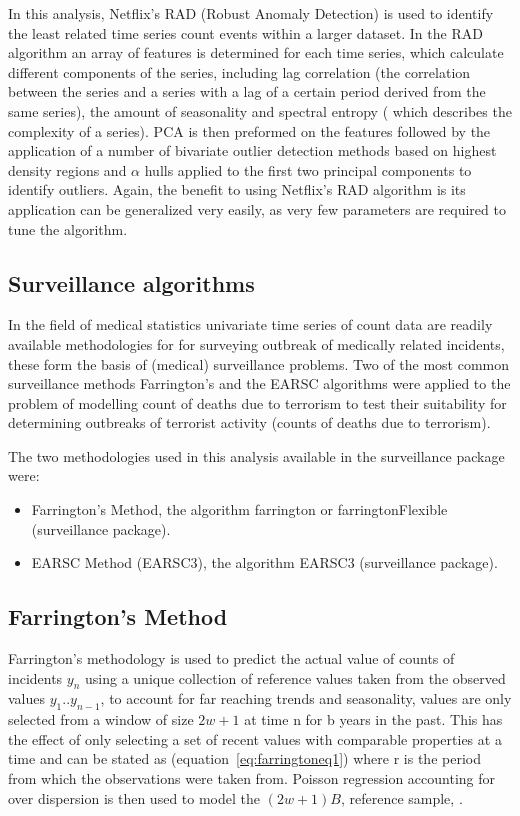 In this analysis, Netflix's RAD (Robust Anomaly Detection)  \citep{RAD2017} is used to identify the least related time series count events within a larger dataset. In the RAD algorithm an array of features is determined for each time series, which calculate different components of the series, including lag correlation (the correlation between the series and a series with a lag of a certain period derived from the same series), the amount of seasonality and spectral entropy ( which describes the complexity of a series). PCA is then preformed on the features followed by the application of a number of bivariate outlier detection methods based on highest density regions and $\alpha$ hulls applied to the first two principal components to identify outliers. Again, the benefit to using Netflix's RAD algorithm is its application can be generalized very easily, as very few parameters are required to tune the algorithm.
 
\subsection{Surveillance algorithms}

In the field of medical statistics univariate time series of count data are readily available methodologies for for surveying outbreak of medically related incidents, these form the basis of (medical) surveillance problems. Two of the most common surveillance methods Farrington's \citep{farrington1996statistical} and the EARSC algorithms \citep{fricker2008comparing} were applied to the problem of modelling count of deaths due to terrorism to test their suitability for determining outbreaks of terrorist activity (counts of deaths due to terrorism).

The two methodologies used in this analysis available in the surveillance package \citep{surveillancepackageR} were:

\begin{itemize}
\item Farrington's Method, the algorithm farrington or farringtonFlexible (surveillance package).
\item  EARSC Method (EARSC3), the algorithm EARSC3 (surveillance package).
\end{itemize}

\subsection{Farrington's Method}
Farrington's methodology \citep{salmon2016monitoring} is  used to predict the actual value of counts of incidents $y_{n}$ using a unique collection of reference values taken from the observed values $y_{1}..y_{n-1}$, to account for far reaching trends and seasonality, values are only selected from a window of size $2w+1$ at time n for b years in the past. This has the effect of only selecting a set of recent values with comparable properties at a time and can be stated as (equation~\ref{eq:farringtoneq1})
where r is the period from which the observations were taken from. Poisson regression accounting for over dispersion is then used to model the $(2w+1)B$, reference sample, \citep{robertson2010review}.


